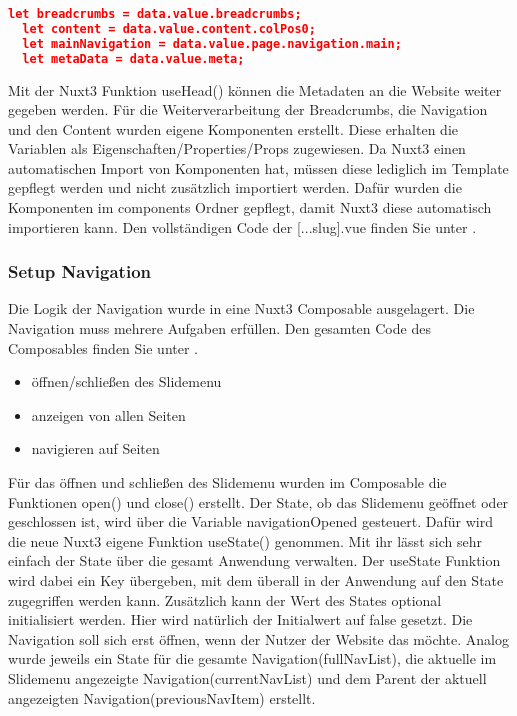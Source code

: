 \begin{lstlisting}[language=json,firstnumber=1]
  let breadcrumbs = data.value.breadcrumbs;
  let content = data.value.content.colPos0;
  let mainNavigation = data.value.page.navigation.main;
  let metaData = data.value.meta;
\end{lstlisting}

Mit der Nuxt3 Funktion useHead() können die Metadaten an die Website weiter gegeben werden. Für die Weiterverarbeitung der Breadcrumbs, die Navigation und den Content wurden eigene Komponenten erstellt. Diese erhalten die Variablen als Eigenschaften/Properties/Props zugewiesen. Da Nuxt3 einen automatischen Import von Komponenten hat, müssen diese lediglich im Template gepflegt werden und nicht zusätzlich importiert werden. Dafür wurden die Komponenten im components Ordner gepflegt, damit Nuxt3 diese automatisch importieren kann. Den vollständigen Code der [...slug].vue finden Sie unter .

\subsubsection{Setup Navigation}
\label{sec:Setup Navigation}

Die Logik der Navigation wurde in eine Nuxt3 Composable ausgelagert. Die Navigation muss mehrere Aufgaben erfüllen. Den gesamten Code des Composables finden Sie unter .

\begin{itemize}
\item öffnen/schließen des Slidemenu
\item anzeigen von allen Seiten
\item navigieren auf Seiten
\end{itemize}

Für das öffnen und schließen des Slidemenu wurden im Composable die Funktionen open() und close() erstellt. Der State, ob das Slidemenu geöffnet oder geschlossen ist, wird über die Variable navigationOpened gesteuert. Dafür wird die neue Nuxt3 eigene Funktion useState() genommen. Mit ihr lässt sich sehr einfach der State über die gesamt Anwendung verwalten. Der useState Funktion wird dabei ein Key übergeben, mit dem überall in der Anwendung auf den State zugegriffen werden kann. Zusätzlich kann der Wert des States optional initialisiert werden. Hier wird natürlich der Initialwert auf false gesetzt. Die Navigation soll sich erst öffnen, wenn der Nutzer der Website das möchte.
Analog wurde jeweils ein State für die gesamte Navigation(fullNavList), die aktuelle im Slidemenu angezeigte Navigation(currentNavList) und dem Parent der aktuell angezeigten Navigation(previousNavItem) erstellt.

